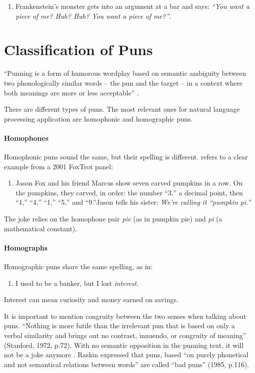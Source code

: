 \documentclass[11pt,a4paper]{article}
\begin{document}
\begin{enumerate}
    \item Frankenstein’s monster gets into an argument at a bar and says: \textit{“You want a piece of me? Huh? Huh? You want a piece of me?”}.
\end{enumerate}

\section{Classification of Puns}
“Punning is a form of humorous wordplay based on semantic ambiguity between two phonologically similar words – the pun and the target – in a context where both meanings are more or less acceptable” \citep[][p.1]{pallmann2025whats}.
\vspace{4pt}

There are different types of puns. The most relevant ones for natural language processing application are homophonic and homographic puns.
\paragraph{Homophones} Homophonic puns sound the same, but their spelling is different. 
\citet[][p.51]{dubinsky2011understanding} refers to a clear example from a 2001 FoxTrot panel:
\begin{enumerate}
    \item Jason Fox and his friend Marcus show seven carved pumpkins in a row.  On the pumpkins, they carved, in order: the number “3,” a decimal point, then “1,” “4,” “1,” “5,” and “9.”Jason tells his sister: \textit{We’re calling it “pumpkin pi.”}
\end{enumerate}
 
The joke relies on the homophone pair \textit{pie} (as in pumpkin pie) and \textit{pi} (a mathematical constant). 

\paragraph{Homographs} Homographic puns share the same spelling, as in:

\begin{enumerate}
    \item I used to be a banker, but I lost \textit{interest}.
\end{enumerate}
Interest can mean curiosity and money earned on savings.
\vspace{4pt}

It is important to mention congruity between the two senses when talking about puns. “Nothing is more futile than the irrelevant pun that is based on only a verbal similarity and brings out no contrast, innuendo, or congruity of meaning” (Stanford, 1972, p.72). With no semantic opposition in the punning text, it will not be a joke anymore \citep{hempelmann2017puns}. Raskin expressed that puns, based “on purely phonetical and not semantical relations between words” are called “bad puns” (1985, p.116). 
\end{document}
